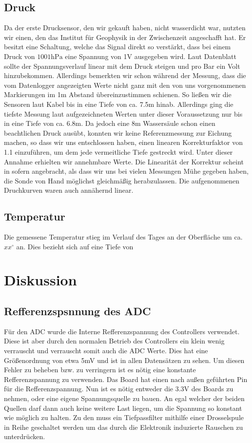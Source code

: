 \documentclass[12pt,a4paper,titlepage,headinclude,bibtotoc]{scrartcl}
\begin{document}
\subsection{Druck}
Da der erste Drucksensor, den wir gekauft haben, nicht wasserdicht war, nutzten wir einen, den das Institut für Geophysik in der Zwischenzeit angeschafft hat.
Er besitzt eine Schaltung, welche das Signal direkt so verstärkt, dass bei einem Druck von $1001\si{\hecto\pascal}$ eine Spannung von 1V ausgegeben wird.
Laut Datenblatt sollte der Spannungsverlauf linear mit dem Druck steigen und pro Bar ein Volt hinzubekommen.
Allerdings bemerkten wir schon während der Messung, dass die vom Datenlogger angezeigten Werte nicht ganz mit den von uns vorgenommenen Markierungen im 1m Abstand übereinzustimmen schienen.
So ließen wir die Sensoren laut Kabel bis in eine Tiefe von ca. 7.5m hinab.
Allerdings ging die tiefste Messung laut aufgezeichneten Werten unter dieser Voraussetzung nur bis in eine Tiefe von ca. 6.8m.
Da jedoch eine 8m Wassersäule schon einen beachtlichen Druck ausübt, konnten wir keine Referenzmessung zur Eichung machen, so dass wir uns entschlossen haben, einen linearen Korrekturfaktor von 1.1 einzuführen, um dem jede vermeitliche Tiefe gestreckt wird.
Unter dieser Annahme erhielten wir annehmbare Werte.
Die Linearität der Korrektur scheint in sofern angebracht, als dass wir uns bei vielen Messungen Mühe gegeben haben, die Sonde von Hand möglichst gleichmäßig herabzulassen.
Die aufgenommenen Druchkurven waren auch annähernd linear.


\subsection{Temperatur}
Die gemessene Temperatur stieg im Verlauf des Tages an der Oberfläche um ca. $xx^\circ$ an.
Dies bezieht sich auf eine Tiefe von  


\section{Diskussion}
\label{sec:diskussion}

\subsection{Refferenzspsnnung des ADC}
Für den ADC wurde die Interne Refferenzspannung des Controllers verwendet.
Diese ist aber durch den normalen Betrieb des Controllers ein klein wenig verrauscht und verrauscht somit auch die ADC Werte.
Dies hat eine Größenordnung von etwa 5\si{\milli\volt} und ist in allen Datensätzen zu sehen.
Um diesen Fehler zu beheben bzw. zu verringern ist es nötig eine konstante Refferenzspannung zu verwenden.
Das Board hat einen nach außen geführten Pin für die Refferenzspannung.
Nun ist es nötig entweder die 3.3\si{\volt} des Boards zu nehmen, oder eine eigene Spannungsquelle zu bauen.
An egal welcher der beiden Quellen darf dann auch keine weitere Last liegen, um die Spannung so konstant wie möglich zu halten.
Zu den muss ein Tiefpassfilter mithilfe einer Drosselspule in Reihe geschaltet werden um das durch die Elektronik induzierte Rauschen zu unterdrücken.
\end{document}
